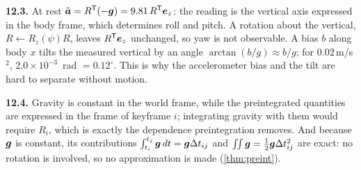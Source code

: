 \textbf{12.3.} At rest $\tilde{\bm{a}}=R^{\mathsf{T}}(-\bm{g})=9.81\,R^{\mathsf{T}}
\bm{e}_z$: the reading is the vertical axis expressed in the body
frame, which determines roll and pitch. A rotation about the vertical,
$R\leftarrow R_z(\psi)R$, leaves $R^{\mathsf{T}}\bm{e}_z$ unchanged, so yaw is not
observable. A bias $b$ along body $x$ tilts the measured vertical by an
angle $\arctan(b/g)\approx b/g$; for $0.02$\,m/s$^2$, $2.0\times10^{-3}$\,
rad $=0.12^\circ$. This is why the accelerometer bias and the tilt are
hard to separate without motion.

\textbf{12.4.} Gravity is constant in the world frame, while the
preintegrated quantities are expressed in the frame of keyframe $i$;
integrating gravity with them would require $R_i$, which is exactly
the dependence preintegration removes. And because $\bm{g}$ is
constant, its contributions $\int_{t_i}^{t_j}\bm{g}\,dt=\bm{g}
\Delta t_{ij}$ and $\iint\bm{g}=\frac12\bm{g}\Delta t_{ij}^2$ are
exact: no rotation is involved, so no approximation is made
(\cref{thm:preint}).
